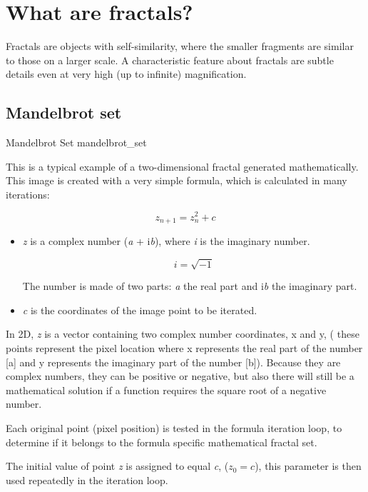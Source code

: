 \section{What are fractals?}\label{what-are-fractals}

Fractals are objects with self-similarity, where the smaller fragments are
similar to those on a larger scale. A characteristic feature about fractals are subtle
details even at very high (up to infinite) magnification.

\subsection{Mandelbrot set}\label{mandelbrot-set}

	{Mandelbrot Set}
	{mandelbrot_set}

This is a typical example of a two-dimensional fractal generated mathematically.
This image is created with a very simple formula, which is calculated in many
iterations:

\[z_{n + 1} = z_{n}^{2} + c\]

\begin{itemize}
	
	
	\item\emph{z} is a complex number (\emph{a} + i\emph{b}), where \emph{i} is
	the imaginary number.
	
	\[ i = \sqrt{-1} \]
	
	The number is made of two parts: \emph{a} the real part and i\emph{b} the
	imaginary part.
	
	\item\emph{c} is the coordinates of the image point to be iterated.
\end{itemize}

In 2D, \emph{z} is a vector containing two complex number coordinates, x and y,
( these points represent the pixel location where x represents the real part of
the number {[}a{]} and y represents the imaginary part of the number {[}b{]}).
Because they are complex numbers, they can be positive or negative, but also
there will still be a mathematical solution if a function requires the square
root of a negative number.

Each original point (pixel position) is tested in the formula iteration loop, to
determine if it belongs to the formula specific mathematical fractal set.

The initial value of point \emph{z} is assigned to equal \emph{c}, ($ z_{0} = c
$), this parameter is then used repeatedly in the iteration loop.

